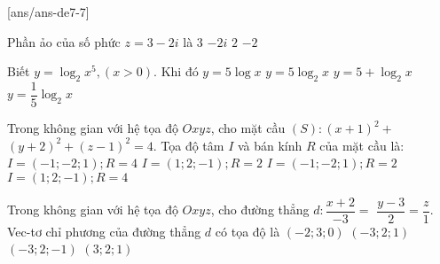 
\begin{name}
	{\tenchude}
	{\tendethi}
	{\tentruong}
	{\thoigian}
\end{name}
[ans/ans-de7-7]

\begin{ex}%
Phần ảo của số phức $z=3-2 i$ là
\choice
{$3$}
{$-2 i$}
{$2$}
{\True $-2$}

\end{ex}
\begin{ex}%
Biết $y=\log_2 x^5,(x>0)$. Khi đó
\choice
{$y=5\log x$}
{\True $y=5\log_2 x$}
{$y=5+\log_2 x$}
{$y=\dfrac{1}{5} \log_2 x$}

\end{ex}
\begin{ex}%
{
\vspace{-0.5cm}
}

\end{ex}
\begin{ex}%
Trong không gian với hệ tọa độ $O x y z$, cho mặt cầu $(S)\colon(x+1)^2+$ $(y+2)^2+(z-1)^2=4$. Tọa độ tâm $I$ và bán kính $R$ của mặt cầu là:
\choice
{$I=(-1;-2; 1); R=4$}
{$I=(1; 2;-1); R=2$}
{\True $I=(-1;-2; 1); R=2$}
{$I=(1; 2;-1); R=4$}

\end{ex}
\begin{ex}%
Trong không gian với hệ tọa độ $O x y z$, cho đường thẳng $d\colon \dfrac{x+2}{-3}=$ $\dfrac{y-3}{2}=\dfrac{z}{1}$. Vec-tơ chỉ phương của đường thẳng $d$ có tọa độ là
\choice
{$(-2; 3; 0)$}
{\True $(-3; 2; 1)$}
{$(-3; 2;-1)$}
{$(3; 2; 1)$}

\end{ex}
